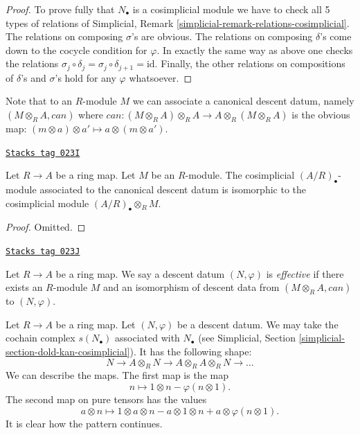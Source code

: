 \begin{proof}
\medskip\noindent
To prove fully that $N_\bullet$ is a cosimplicial module we have to check
all 5 types of relations of
Simplicial, Remark \ref{simplicial-remark-relations-cosimplicial}.
The relations on composing $\sigma$'s are obvious.
The relations on composing $\delta$'s come down to the
cocycle condition for $\varphi$.
In exactly the same way as above one checks the relations
$\sigma_j \circ \delta_j = \sigma_j \circ \delta_{j + 1} = \text{id}$.
Finally, the other relations on compositions of $\delta$'s and $\sigma$'s
hold for any $\varphi$ whatsoever.
\end{proof}

Note that to an $R$-module $M$ we can associate a canonical
descent datum, namely $(M \otimes_R A, can)$ where
$can : (M \otimes_R A) \otimes_R A \to A \otimes_R (M \otimes_R A)$
is the obvious map:
$(m \otimes a) \otimes a' \mapsto a \otimes (m \otimes a')$.

\begin{lemma}
\label{descent-lemma-canonical-descent-datum-cosimplicial}
\href{https://stacks.math.columbia.edu/tag/023I}{\texttt{Stacks tag 023I}}

Let $R \to A$ be a ring map.
Let $M$ be an $R$-module. The cosimplicial
$(A/R)_\bullet$-module associated to the canonical descent
datum is isomorphic to the cosimplicial module $(A/R)_\bullet \otimes_R M$.
\end{lemma}

\begin{proof}
Omitted.
\end{proof}

\begin{definition}
\label{descent-definition-descent-datum-effective-module}
\href{https://stacks.math.columbia.edu/tag/023J}{\texttt{Stacks tag 023J}}

Let $R \to A$ be a ring map.
We say a descent datum $(N, \varphi)$ is {\it effective}
if there exists an $R$-module $M$ and an isomorphism
of descent data from $(M \otimes_R A, can)$ to
$(N, \varphi)$.
\end{definition}

Let $R \to A$ be a ring map.
Let $(N, \varphi)$ be a descent datum.
We may take the cochain complex $s(N_\bullet)$ associated
with $N_\bullet$ (see
Simplicial, Section \ref{simplicial-section-dold-kan-cosimplicial}).
It has the following shape:
$$
N \to A \otimes_R N \to A \otimes_R A \otimes_R N \to \ldots
$$
We can describe the maps.
The first map is the map
$$
n \longmapsto 1 \otimes n - \varphi(n \otimes 1).
$$
The second map on pure tensors has the values
$$
a \otimes n \longmapsto 1 \otimes a \otimes n
- a \otimes 1 \otimes n + a \otimes \varphi(n \otimes 1).
$$
It is clear how the pattern continues.

